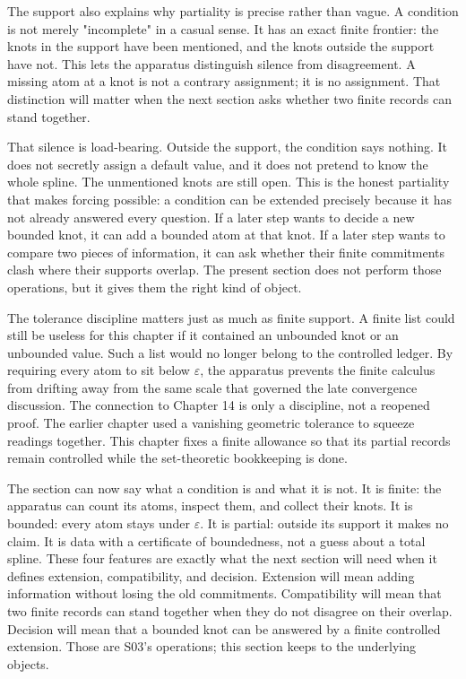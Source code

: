 The support also explains why partiality is precise rather than vague. A
condition is not merely "incomplete" in a casual sense. It has an exact finite
frontier: the knots in the support have been mentioned, and the knots outside
the support have not. This lets the apparatus distinguish silence from
disagreement. A missing atom at a knot is not a contrary assignment; it is no
assignment. That distinction will matter when the next section asks whether two
finite records can stand together.

That silence is load-bearing. Outside the support, the condition says nothing.
It does not secretly assign a default value, and it does not pretend to know the
whole spline. The unmentioned knots are still open. This is the honest
partiality that makes forcing possible: a condition can be extended precisely
because it has not already answered every question. If a later step wants to
decide a new bounded knot, it can add a bounded atom at that knot. If a later
step wants to compare two pieces of information, it can ask whether their
finite commitments clash where their supports overlap. The present section
does not perform those operations, but it gives them the right kind of object.

The tolerance discipline matters just as much as finite support. A finite list
could still be useless for this chapter if it contained an unbounded knot or an
unbounded value. Such a list would no longer belong to the controlled ledger.
By requiring every atom to sit below \(\varepsilon\), the apparatus prevents
the finite calculus from drifting away from the same scale that governed the
late convergence discussion. The connection to Chapter 14 is only a discipline,
not a reopened proof. The earlier chapter used a vanishing geometric tolerance
to squeeze readings together. This chapter fixes a finite allowance so that its
partial records remain controlled while the set-theoretic bookkeeping is done.

The section can now say what a condition is and what it is not. It is finite:
the apparatus can count its atoms, inspect them, and collect their knots. It is
bounded: every atom stays under \(\varepsilon\). It is partial: outside its
support it makes no claim. It is data with a certificate of boundedness, not a
guess about a total spline. These four features are exactly what the next
section will need when it defines extension, compatibility, and decision.
Extension will mean adding information without losing the old commitments.
Compatibility will mean that two finite records can stand together when they
do not disagree on their overlap. Decision will mean that a bounded knot can be
answered by a finite controlled extension. Those are S03's operations; this
section keeps to the underlying objects.

